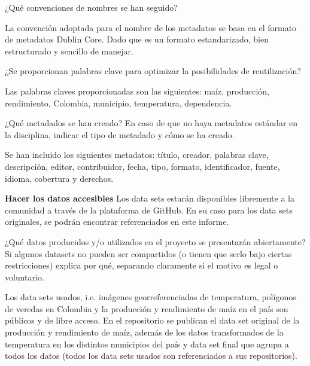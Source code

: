 \documentclass[12pt, spanish]{article}
\begin{document}
\begin{shaded}
¿Qué convenciones de nombres se han seguido?
\end{shaded}

La convención adoptada para el nombre de los metadatos se basa en el formato de metadatos Dublin Core. Dado que es un formato estandarizado, bien estructurado y sencillo de manejar.
\begin{shaded}
¿Se proporcionan palabras clave para optimizar la posibilidades de reutilización?
\end{shaded}
Las palabras claves proporcionadas son las siguientes: maíz, producción, rendimiento, Colombia, municipio, temperatura, dependencia.

\begin{shaded}
¿Qué metadados se han creado? En caso de que no haya metadatos estándar en la disciplina, indicar el tipo de metadado y cómo se ha creado.
\end{shaded}
Se han incluido los siguientes metadatos: título, creador, palabras clave, descripción, editor, contribuidor, fecha, tipo, formato, identificador, fuente, idioma, cobertura y derechos.

\textbf{Hacer los datos accesibles}
Los data sets estarán disponibles libremente a la comunidad a través de la plataforma de GitHub. En su caso para los data sets originales, se podrán encontrar referenciados en este informe.

\begin{shaded}
¿Qué datos producidos y/o utilizados en el proyecto se presentarán abiertamente? Si algunos datasets no pueden ser compartidos (o tienen que serlo bajo ciertas restricciones) explica por qué, separando claramente si el motivo es legal o voluntario. 
\end{shaded}
Los data sets usados, i.e. imágenes georreferenciadas de temperatura, polígonos de veredas en Colombia y la producción y rendimiento de maíz en el país son públicos y de libre acceso. En el repositorio se publican el data set original de la producción y rendimiento de maíz, además de los datos transformados de la temperatura en los distintos municipios del país y data set final que agrupa a todos los datos (todos los data sets usados son referenciados a sus repositorios).\\

\end{document}
